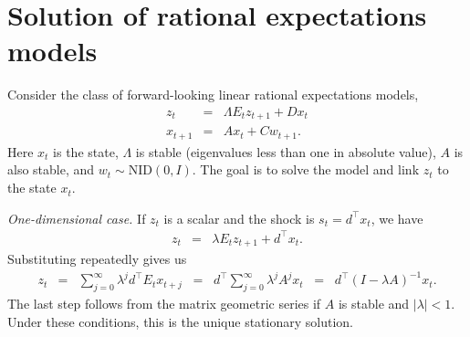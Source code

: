\documentclass[12pt]{article}
\newcounter{tab}
\begin{document}
{%
%



\pagebreak
\appendix
\section{Solution of rational expectations models}
\label{app:hs-formulas}


Consider the class of forward-looking linear rational expectations models,
\begin{eqnarray*}
         z_t     &=& \Lambda E_t z_{t+1} + D x_t \\
        x_{t+1}  &=& A x_t + C w_{t+1} .
\end{eqnarray*}
Here $x_t$ is the state,
$\Lambda$ is stable (eigenvalues less than one in absolute value),
$A$ is also stable,
and  $w_t \sim \mbox{NID}(0,I)$.
The goal is to solve the model and link $z_t$ to the state $x_t$.


{\it One-dimensional case.\/}
If $z_t$ is a scalar and the shock is $s_t = d^\top x_t$, we have
\begin{eqnarray}
    z_t &=&    \lambda E_t z_{t+1} + d^\top x_{t} .
    \label{eq:for-diff-eq-scalar}
\end{eqnarray}
Substituting repeatedly gives us
\begin{eqnarray*}
    z_t &=&  \sum_{j=0}^\infty \lambda^j  d^\top E_t x_{t+j}
        \;\;=\;\;  d^\top \sum_{j=0}^\infty \lambda^j  A^j x_{t}
        \;\;=\;\;  d^\top (I-\lambda A)^{-1} x_t.
\end{eqnarray*}
The last step follows from the matrix geometric series if $A$ is stable and $|\lambda|<1$.
Under these conditions, this is the unique stationary solution.


}
\end{document}
